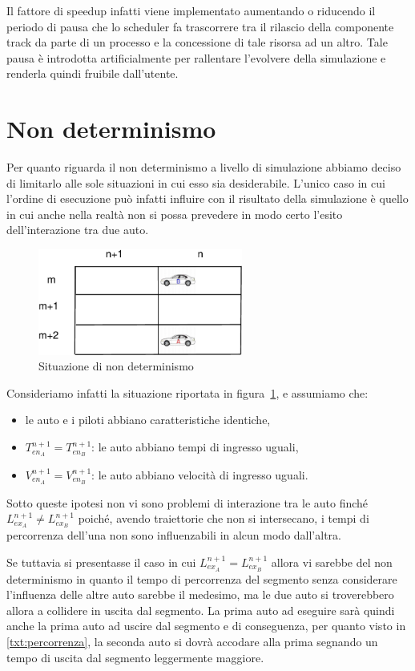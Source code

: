 \documentclass[11pt,a4paper]{report}
\begin{document}
Il fattore di speedup infatti viene implementato aumentando o riducendo il periodo di pausa che lo scheduler fa trascorrere tra il rilascio della componente track da parte di un processo e la concessione di tale risorsa ad un altro.
Tale pausa è introdotta artificialmente per rallentare l'evolvere della simulazione e renderla quindi fruibile dall'utente.

\section{Non determinismo}
Per quanto riguarda il non determinismo a livello di simulazione abbiamo deciso di limitarlo alle sole situazioni in cui esso sia desiderabile.
L'unico caso in cui l'ordine di esecuzione può infatti influire con il risultato della simulazione è quello in cui anche nella realtà non si possa prevedere in modo certo l'esito dell'interazione tra due auto.

\begin{figure}
\includegraphics[width=0.6\textwidth]{diagrammi/NonDet}
\caption{Situazione di non determinismo}
\label{fig:nonDet}
\end{figure}

Consideriamo infatti la situazione riportata in figura~\ref{fig:nonDet}, e assumiamo che:
\begin{itemize}
\item le auto e i piloti abbiano caratteristiche identiche,
\item $T_{en_A}^{n+1} = T_{en_B}^{n+1}$: le auto abbiano tempi di ingresso uguali,
\item $V_{en_A}^{n+1} = V_{en_B}^{n+1}$: le auto abbiano velocità di ingresso uguali.
\end{itemize}

Sotto queste ipotesi non vi sono problemi di interazione tra le auto finché $L_{ex_A}^{n+1} \neq L_{ex_B}^{n+1}$ poiché, avendo traiettorie che non si intersecano, i tempi di percorrenza dell'una non sono influenzabili in alcun modo dall'altra.

Se tuttavia si presentasse il caso in cui $L_{ex_A}^{n+1} = L_{ex_B}^{n+1}$ allora vi sarebbe del non determinismo in quanto il tempo di percorrenza del segmento senza considerare l'influenza delle altre auto sarebbe il medesimo, ma le due auto si troverebbero allora a collidere in uscita dal segmento. La prima auto ad eseguire sarà quindi anche la prima auto ad uscire dal segmento e di conseguenza, per quanto visto in \ref{txt:percorrenza}, la seconda auto si dovrà accodare alla prima segnando un tempo di uscita dal segmento leggermente maggiore.
\end{document}
